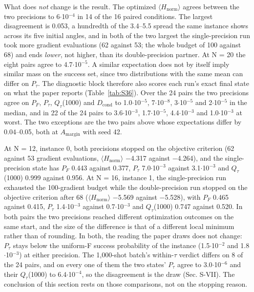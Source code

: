 \documentclass[journal]{IEEEtran}
\begin{document}
What does \textit{not} change is the result. The optimized $\langle$$H_{\mathrm{norm}}$$\rangle$ agrees between the two precisions to 6$\cdot$10$^{-4}$ in 14 of the 16 paired conditions. The largest disagreement is 0.053, a hundredth of the 3.4--5.5 spread the same instance shows across its five initial angles, and in both of the two largest the single-precision run took more gradient evaluations (62 against 53; the whole budget of 100 against 68) and ends \textit{lower}, not higher, than its double-precision partner. At N = 20 the eight pairs agree to 4.7$\cdot$10$^{-5}$. A similar expectation does not by itself imply similar mass on the success set, since two distributions with the same mean can differ on $P_{\tau}$. The diagnostic block therefore also scores each run's exact final state on what the paper reports (Table~\ref{tab:S36}). Over the 24 pairs the two precisions agree on $P_{F}$, $P_{\tau}$, $Q_{\tau}$(1000) and $D_{\mathrm{cond}}$ to 1.0$\cdot$10$^{-5}$, 7$\cdot$10$^{-8}$, 3$\cdot$10$^{-5}$ and 2$\cdot$10$^{-5}$ in the median, and in 22 of the 24 pairs to 3.6$\cdot$10$^{-3}$, 1.7$\cdot$10$^{-5}$, 4.4$\cdot$10$^{-3}$ and 1.0$\cdot$10$^{-3}$ at worst. The two exceptions are the two pairs above whose expectations differ by 0.04--0.05, both at $A_{\mathrm{margin}}$ with seed 42.


At N = 12, instance 0, both precisions stopped on the objective criterion (62 against 53 gradient evaluations, $\langle$$H_{\mathrm{norm}}$$\rangle$ $-$4.317 against $-$4.264), and the single-precision state has $P_{F}$ 0.443 against 0.377, $P_{\tau}$ 7.0$\cdot$10$^{-3}$ against 3.1$\cdot$10$^{-3}$ and $Q_{\tau}$(1000) 0.999 against 0.956. At N = 16, instance 1, the single-precision run exhausted the 100-gradient budget while the double-precision run stopped on the objective criterion after 68 ($\langle$$H_{\mathrm{norm}}$$\rangle$ $-$5.569 against $-$5.528), with $P_{F}$ 0.465 against 0.415, $P_{\tau}$ 1.4$\cdot$10$^{-3}$ against 0.7$\cdot$10$^{-3}$ and $Q_{\tau}$(1000) 0.747 against 0.520. In both pairs the two precisions reached different optimization outcomes on the same start, and the size of the difference is that of a different local minimum rather than of rounding. In both, the reading the paper draws does not change: $P_{\tau}$ stays below the uniform-F success probability of the instance (1.5$\cdot$10$^{-2}$ and 1.8$\cdot$10$^{-3}$) at either precision. The 1,000-shot batch's within-$\tau$ verdict differs on 8 of the 24 pairs, and on every one of them the two states' $P_{\tau}$ agree to 3.0$\cdot$10$^{-6}$ and their $Q_{\tau}$(1000) to 6.4$\cdot$10$^{-4}$, so the disagreement is the draw (Sec. S-VII). The conclusion of this section rests on those comparisons, not on the stopping reason.
\end{document}
